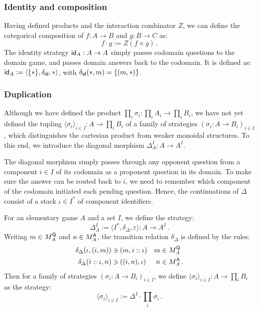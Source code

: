 
\subsubsection{Identity and composition} %

Having defined products and the interaction combinator $Z$,
we can define the categorical composition of
$f : A \rightarrow B$ and $g : B \rightarrow C$ as:
\[
    f \cdot g := Z(f \times g) \,.
\]
The identity strategy $ \mathsf{id} _A : A \rightarrow A$
simply passes codomain questions to the domain game,
and passes domain answers back to the codomain.
It is defined as:
$ \mathsf{id} _A := \langle \{ * \}, \delta_{ \mathsf{id} }, * \rangle$,
with $\delta_{ \mathsf{id} }(*, m) = \{(m, *)\}$.


\subsubsection{Duplication} %

Although we have defined the product
$\prod_i \sigma_i : \prod_i A_i \rightarrow \prod_i B_i$,
we have not yet defined the tupling
$\langle \sigma_i \rangle_{i \in I} : A \rightarrow \prod_i B_i$
of a family of strategies
$(\sigma_i : A \rightarrow B_i)_{i \in I}$,
which distinguishes the cartesian product
from weaker monoidal structures.
To this end,
we introduce the diagonal morphism
$\Delta_A^I : A \rightarrow A^I$.

The diagonal morphism simply passes through any
opponent question from a component $i \in I$ of its codomain
as a proponent question in its domain.
To make sure the answer can be routed back to $i$,
we need to remember which component of the codomain initiated
each pending question.
Hence,
the continuations of $\Delta$
consist of a stack $\iota \in I^*$
of component identifiers.

\begin{definition} %
For an elementary game $A$ and a set $I$,
we define the strategy:
\[ \Delta_A^I := \langle I^*, \delta_\Delta, \varepsilon \rangle
  : A \rightarrow A^I \,. \]
Writing $m \in M_A^{ \mathsf{Q} }$ and $n \in M_A^{ \mathsf{A} }$,
the transition relation $\delta_\Delta$
is defined by the rules:
\begin{align*}
  \delta_\Delta(\iota, (i, m)) &\ni (m, i :: \iota) & m &\in M_A^{ \mathsf{Q} } \\
  \delta_\Delta(i :: \iota, n) &\ni ((i, n), \iota) & n &\in M_A^{ \mathsf{A} } \,.
\end{align*}
Then for a family of strategies $(\sigma_i : A \rightarrow B_i)_{i \in I}$,
we define
$\langle \sigma_i \rangle_{i \in I} : A \rightarrow \prod_i B_i$
as the strategy:
\[
    \langle \sigma_i \rangle_{i \in I} := 
      \Delta^I \cdot \prod_i \sigma_i \,.
\]
\end{definition}

